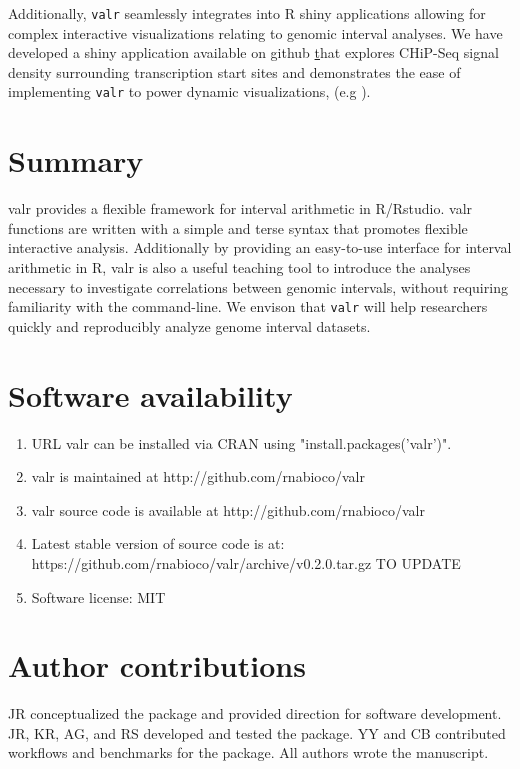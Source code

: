 \documentclass[9pt,a4paper]{extarticle}
\begin{document}
Additionally, \texttt{valr} seamlessly integrates into R shiny applications allowing for complex interactive visualizations relating to genomic interval analyses. We have developed a shiny application available on github \href{https://github.com/rnabioco/valrdata} that explores CHiP-Seq signal density surrounding transcription start sites and demonstrates the ease of implementing \texttt{valr} to power dynamic visualizations, (e.g ).

\section*{Summary} %
valr provides a flexible framework for interval arithmetic in R/Rstudio. valr functions are written with a simple and terse syntax that promotes flexible interactive analysis. Additionally by providing an easy-to-use interface for interval arithmetic in R, valr is also a useful teaching tool to introduce the analyses necessary to investigate correlations between genomic intervals, without requiring familiarity with the command-line. We envison that \texttt{valr} will help researchers quickly and reproducibly analyze genome interval datasets.

\section*{Software availability}
\begin{enumerate}
\item URL valr can be installed via CRAN using "install.packages('valr')".
\item valr is maintained at http://github.com/rnabioco/valr
\item valr source code is available at http://github.com/rnabioco/valr
\item Latest stable version of source code is at: https://github.com/rnabioco/valr/archive/v0.2.0.tar.gz TO UPDATE
\item Software license: MIT
\end{enumerate}

\section*{Author contributions}

JR conceptualized the package and provided direction for software development. JR, KR, AG, and RS developed and tested the package.  YY and CB contributed workflows and benchmarks for the package. All authors wrote the manuscript.
\end{document}
